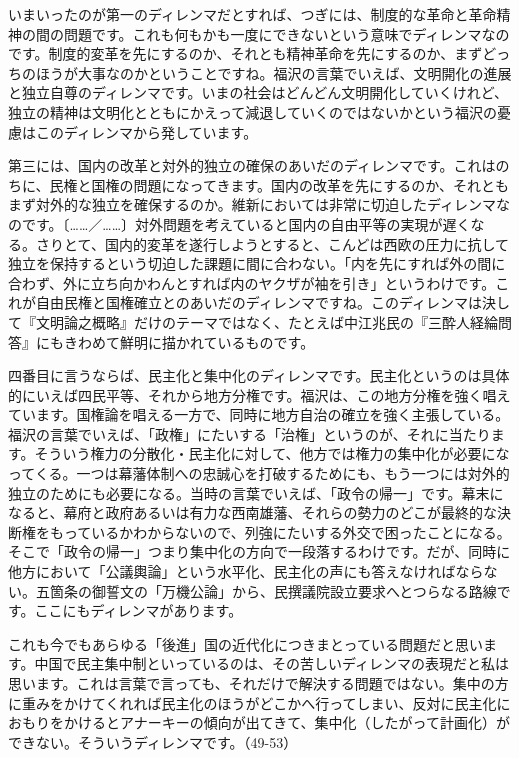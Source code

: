 いまいったのが第一のディレンマだとすれば、つぎには、制度的な革命と革命精神の間の問題です。これも何もかも一度にできないという意味でディレンマなのです。制度的変革を先にするのか、それとも精神革命を先にするのか、まずどっちのほうが大事なのかということですね。福沢の言葉でいえば、文明開化の進展と独立自尊のディレンマです。いまの社会はどんどん文明開化していくけれど、独立の精神は文明化とともにかえって減退していくのではないかという福沢の憂慮はこのディレンマから発しています。

第三には、国内の改革と対外的独立の確保のあいだのディレンマです。これはのちに、民権と国権の問題になってきます。国内の改革を先にするのか、それともまず対外的な独立を確保するのか。維新においては非常に切迫したディレンマなのです。〔……／……〕対外問題を考えていると国内の自由平等の実現が遅くなる。さりとて、国内的変革を遂行しようとすると、こんどは西欧の圧力に抗して独立を保持するという切迫した課題に間に合わない。「内を先にすれば外の間に合わず、外に立ち向かわんとすれば内のヤクザが袖を引き」というわけです。これが自由民権と国権確立とのあいだのディレンマですね。このディレンマは決して『文明論之概略』だけのテーマではなく、たとえば中江兆民の『三酔人経綸問答』にもきわめて鮮明に描かれているものです。

四番目に言うならば、民主化と集中化のディレンマです。民主化というのは具体的にいえば四民平等、それから地方分権です。福沢は、この地方分権を強く唱えています。国権論を唱える一方で、同時に地方自治の確立を強く主張している。福沢の言葉でいえば、「政権」にたいする「治権」というのが、それに当たります。そういう権力の分散化・民主化に対して、他方では権力の集中化が必要になってくる。一つは幕藩体制への忠誠心を打破するためにも、もう一つには対外的独立のためにも必要になる。当時の言葉でいえば、「政令の帰一」です。幕末になると、幕府と政府あるいは有力な西南雄藩、それらの勢力のどこが最終的な決断権をもっているかわからないので、列強にたいする外交で困ったことになる。そこで「政令の帰一」つまり集中化の方向で一段落するわけです。だが、同時に他方において「公議輿論」という水平化、民主化の声にも答えなければならない。五箇条の御誓文の「万機公論」から、民撰議院設立要求へとつらなる路線です。ここにもディレンマがあります。

これも今でもあらゆる「後進」国の近代化につきまとっている問題だと思います。中国で民主集中制といっているのは、その苦しいディレンマの表現だと私は思います。これは言葉で言っても、それだけで解決する問題ではない。集中の方に重みをかけてくれれば民主化のほうがどこかへ行ってしまい、反対に民主化におもりをかけるとアナーキーの傾向が出てきて、集中化（したがって計画化）ができない。そういうディレンマです。（49-53）

